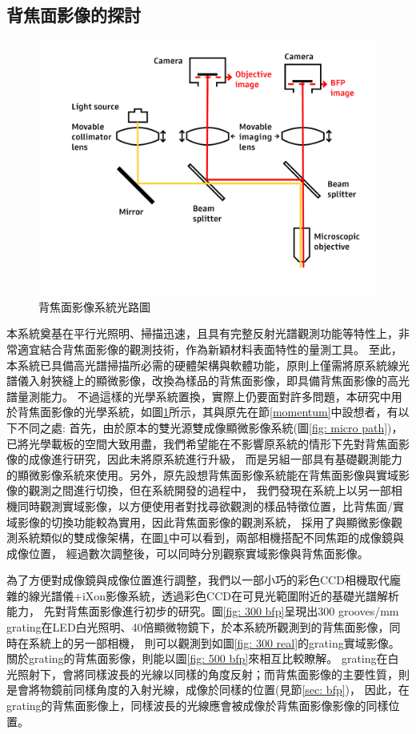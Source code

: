 \documentclass[12pt]{article}
\begin{document}
\subsection{背焦面影像的探討}
\begin{figure}
    \centering
    \includegraphics[width = 0.9\linewidth]{lightPath3.jpg}
    \caption{背焦面影像系統光路圖}
    \label{fig: bfp path}
\end{figure}
本系統奠基在平行光照明、掃描迅速，且具有完整反射光譜觀測功能等特性上，非常適宜結合背焦面影像的觀測技術，作為新穎材料表面特性的量測工具。
至此，本系統已具備高光譜掃描所必需的硬體架構與軟體功能，原則上僅需將原系統線光譜儀入射狹縫上的顯微影像，改換為樣品的背焦面影像，即具備背焦面影像的高光譜量測能力。
不過這樣的光學系統置換，實際上仍要面對許多問題，本研究中用於背焦面影像的光學系統，如圖\ref{fig: bfp path}所示，其與原先在節\ref{momentum}中設想者，有以下不同之處:
首先，由於原本的雙光源雙成像顯微影像系統(圖\ref{fig: micro path})，已將光學載板的空間大致用盡，我們希望能在不影響原系統的情形下先對背焦面影像的成像進行研究，因此未將原系統進行升級，
而是另組一部具有基礎觀測能力的顯微影像系統來使用。另外，原先設想背焦面影像系統能在背焦面影像與實域影像的觀測之間進行切換，但在系統開發的過程中，
我們發現在系統上以另一部相機同時觀測實域影像，以方便使用者對找尋欲觀測的樣品特徵位置，比背焦面/實域影像的切換功能較為實用，因此背焦面影像的觀測系統，
採用了與顯微影像觀測系統類似的雙成像架構，在圖\ref{fig: bfp path}中可以看到，兩部相機搭配不同焦距的成像鏡與成像位置，
經過數次調整後，可以同時分別觀察實域影像與背焦面影像。

為了方便對成像鏡與成像位置進行調整，我們以一部小巧的彩色CCD相機取代龐雜的線光譜儀+iXon影像系統，透過彩色CCD在可見光範圍附近的基礎光譜解析能力，
先對背焦面影像進行初步的研究。圖\ref{fig: 300 bfp}呈現出300 grooves/mm grating在LED白光照明、40倍顯微物鏡下，於本系統所觀測到的背焦面影像，同時在系統上的另一部相機，
則可以觀測到如圖\ref{fig: 300 real}的grating實域影像。關於grating的背焦面影像，則能以圖\ref{fig: 500 bfp}來相互比較瞭解。
grating在白光照射下，會將同樣波長的光線以同樣的角度反射；而背焦面影像的主要性質，則是會將物鏡前同樣角度的入射光線，成像於同樣的位置(見節\ref{sec: bfp})，
因此，在grating的背焦面影像上，同樣波長的光線應會被成像於背焦面影像影像的同樣位置。\cite{inproceedings}
\end{document}
